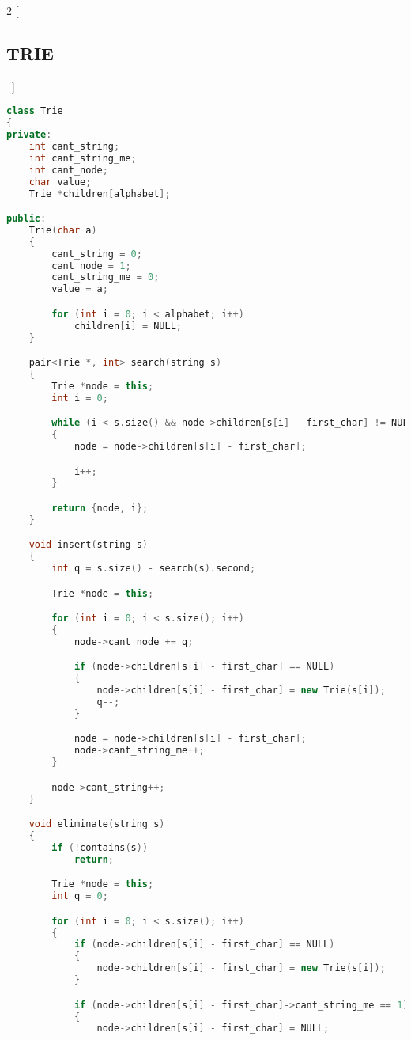 \documentclass[leter]{amsart}
\begin{document}
\begin{multicols}{2}
[\subsection{TRIE}\ ]
\begin{lstlisting}[language=C++]
class Trie
{
private:
    int cant_string;
    int cant_string_me;
    int cant_node;
    char value;
    Trie *children[alphabet];

public:
    Trie(char a)
    {
        cant_string = 0;
        cant_node = 1;
        cant_string_me = 0;
        value = a;

        for (int i = 0; i < alphabet; i++)
            children[i] = NULL;
    }

    pair<Trie *, int> search(string s)
    {
        Trie *node = this;
        int i = 0;

        while (i < s.size() && node->children[s[i] - first_char] != NULL)
        {
            node = node->children[s[i] - first_char];

            i++;
        }

        return {node, i};
    }

    void insert(string s)
    {
        int q = s.size() - search(s).second;

        Trie *node = this;

        for (int i = 0; i < s.size(); i++)
        {
            node->cant_node += q;

            if (node->children[s[i] - first_char] == NULL)
            {
                node->children[s[i] - first_char] = new Trie(s[i]);
                q--;
            }

            node = node->children[s[i] - first_char];
            node->cant_string_me++;
        }

        node->cant_string++;
    }

    void eliminate(string s)
    {
        if (!contains(s))
            return;

        Trie *node = this;
        int q = 0;

        for (int i = 0; i < s.size(); i++)
        {
            if (node->children[s[i] - first_char] == NULL)
            {
                node->children[s[i] - first_char] = new Trie(s[i]);
            }

            if (node->children[s[i] - first_char]->cant_string_me == 1)
            {
                node->children[s[i] - first_char] = NULL;


\end{lstlisting}
\end{multicols}
\end{document}
